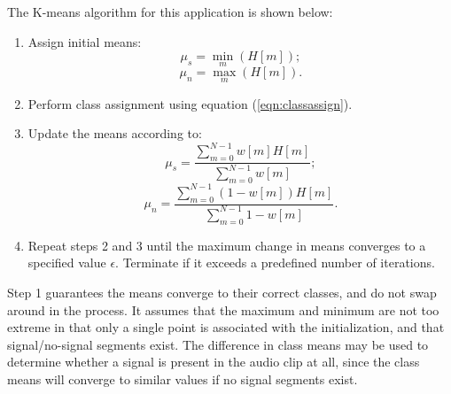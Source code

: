\begin{subappendices}
	The K-means algorithm for this application is shown below:
	\begin{enumerate}
		\item Assign initial means:
		\begin{equation*}
			\mu_s = \min\limits_{m}\left(H[m]\right);
		\end{equation*}
		\begin{equation*}
			\mu_n = \max\limits_{m}\left(H[m]\right).
		\end{equation*}
		\item Perform class assignment using equation (\ref{eqn:classassign}).
		\item Update the means according to:
			\begin{equation*}
				\mu_s = \frac{\sum_{m=0}^{N-1} w[m] H[m]}{\sum_{m=0}^{N-1} w[m] };
			\end{equation*}
			\begin{equation*}
				\mu_n = \frac{\sum_{m=0}^{N-1} (1-w[m]) H[m]}{\sum_{m=0}^{N-1} 1 - w[m] }.
			\end{equation*}
		\item Repeat steps 2 and 3 until the maximum change in means converges to a specified value $\epsilon$. Terminate if it exceeds a predefined number of iterations.
	\end{enumerate}
	
	Step 1 guarantees the means converge to their correct classes, and do not swap around in the process. It assumes that the maximum and minimum are not too extreme in that only a single point is associated with the initialization, and that signal/no-signal segments exist. The difference in class means may be used to determine whether a signal is present in the audio clip at all, since the class means will converge to similar values if no signal segments exist.
\end{subappendices}


